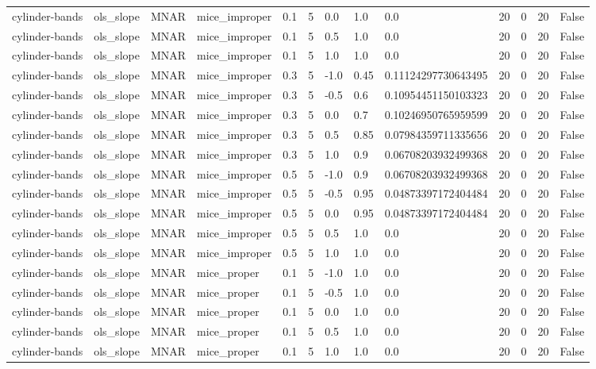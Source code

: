 \begin{tabular}{lllllllllllll}
cylinder-bands & ols\_slope & MNAR & mice\_improper & 0.1 & 5 & 0.0 & 1.0 & 0.0 & 20 & 0 & 20 & False \\
cylinder-bands & ols\_slope & MNAR & mice\_improper & 0.1 & 5 & 0.5 & 1.0 & 0.0 & 20 & 0 & 20 & False \\
cylinder-bands & ols\_slope & MNAR & mice\_improper & 0.1 & 5 & 1.0 & 1.0 & 0.0 & 20 & 0 & 20 & False \\
cylinder-bands & ols\_slope & MNAR & mice\_improper & 0.3 & 5 & -1.0 & 0.45 & 0.11124297730643495 & 20 & 0 & 20 & False \\
cylinder-bands & ols\_slope & MNAR & mice\_improper & 0.3 & 5 & -0.5 & 0.6 & 0.10954451150103323 & 20 & 0 & 20 & False \\
cylinder-bands & ols\_slope & MNAR & mice\_improper & 0.3 & 5 & 0.0 & 0.7 & 0.10246950765959599 & 20 & 0 & 20 & False \\
cylinder-bands & ols\_slope & MNAR & mice\_improper & 0.3 & 5 & 0.5 & 0.85 & 0.07984359711335656 & 20 & 0 & 20 & False \\
cylinder-bands & ols\_slope & MNAR & mice\_improper & 0.3 & 5 & 1.0 & 0.9 & 0.06708203932499368 & 20 & 0 & 20 & False \\
cylinder-bands & ols\_slope & MNAR & mice\_improper & 0.5 & 5 & -1.0 & 0.9 & 0.06708203932499368 & 20 & 0 & 20 & False \\
cylinder-bands & ols\_slope & MNAR & mice\_improper & 0.5 & 5 & -0.5 & 0.95 & 0.04873397172404484 & 20 & 0 & 20 & False \\
cylinder-bands & ols\_slope & MNAR & mice\_improper & 0.5 & 5 & 0.0 & 0.95 & 0.04873397172404484 & 20 & 0 & 20 & False \\
cylinder-bands & ols\_slope & MNAR & mice\_improper & 0.5 & 5 & 0.5 & 1.0 & 0.0 & 20 & 0 & 20 & False \\
cylinder-bands & ols\_slope & MNAR & mice\_improper & 0.5 & 5 & 1.0 & 1.0 & 0.0 & 20 & 0 & 20 & False \\
cylinder-bands & ols\_slope & MNAR & mice\_proper & 0.1 & 5 & -1.0 & 1.0 & 0.0 & 20 & 0 & 20 & False \\
cylinder-bands & ols\_slope & MNAR & mice\_proper & 0.1 & 5 & -0.5 & 1.0 & 0.0 & 20 & 0 & 20 & False \\
cylinder-bands & ols\_slope & MNAR & mice\_proper & 0.1 & 5 & 0.0 & 1.0 & 0.0 & 20 & 0 & 20 & False \\
cylinder-bands & ols\_slope & MNAR & mice\_proper & 0.1 & 5 & 0.5 & 1.0 & 0.0 & 20 & 0 & 20 & False \\
cylinder-bands & ols\_slope & MNAR & mice\_proper & 0.1 & 5 & 1.0 & 1.0 & 0.0 & 20 & 0 & 20 & False \\

\end{tabular}
